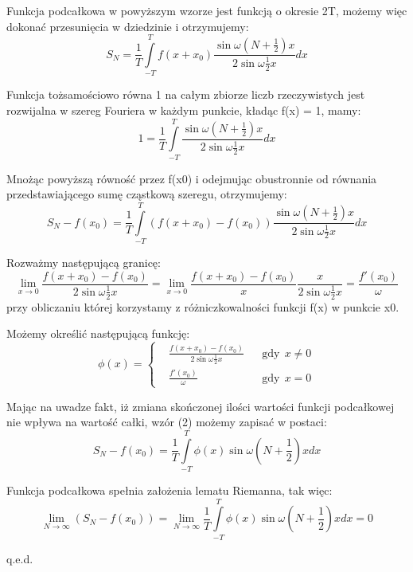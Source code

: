 \documentclass{article}
\begin{document}
Funkcja podcałkowa w powyższym wzorze jest funkcją o okresie 2T, możemy więc dokonać przesunięcia w dziedzinie i otrzymujemy: 
\begin{displaymath}
S_{N}={\frac {1}{T}}\int \limits _{-T}^{T}f(x+x_{0}){\frac {\sin \omega \left(N+{\frac {1}{2}}\right)x}{2\sin \omega {\frac {1}{2}}x}}dx
\end{displaymath}

Funkcja tożsamościowo równa 1 na całym zbiorze liczb rzeczywistych jest rozwijalna w szereg Fouriera w każdym punkcie, kładąc f(x) = 1, mamy: 
\begin{displaymath}
1={\frac {1}{T}}\int \limits _{-T}^{T}{\frac {\sin \omega \left(N+{\frac {1}{2}}\right)x}{2\sin \omega {\frac {1}{2}}x}}dx
\end{displaymath}

Mnożąc powyższą równość przez f(x0) i odejmując obustronnie od równania przedstawiającego sumę cząstkową szeregu, otrzymujemy: 
\begin{displaymath}
S_{N}-f(x_{0})={\frac {1}{T}}\int \limits _{-T}^{T}(f(x+x_{0})-f(x_{0})){\frac {\sin \omega \left(N+{\frac {1}{2}}\right)x}{2\sin \omega {\frac {1}{2}}x}}dx
\end{displaymath}

Rozważmy następującą granicę: 
\begin{displaymath}
\lim _{x\to 0}{\frac {f(x+x_{0})-f(x_{0})}{2\sin \omega {\frac {1}{2}}x}}=\lim _{x\to 0}{\frac {f(x+x_{0})-f(x_{0})}{x}}{\frac {x}{2\sin \omega {\frac {1}{2}}x}}={\frac {f'(x_{0})}{\omega }}
\end{displaymath}
przy obliczaniu której korzystamy z różniczkowalności funkcji f(x) w punkcie x0.

Możemy określić następującą funkcję: 
\begin{displaymath}
\phi (x)=\left\{{\begin{aligned}&{\frac {f(x+x_{0})-f(x_{0})}{2\sin \omega {\frac {1}{2}}x}}&&{\text{gdy}}~~x\neq 0\\&{\frac {f'(x_{0})}{\omega }}&&{\text{gdy}}~~x=0\end{aligned}}\right.
\end{displaymath}

Mając na uwadze fakt, iż zmiana skończonej ilości wartości funkcji podcałkowej nie wpływa na wartość całki, wzór (2) możemy zapisać w postaci: 
\begin{displaymath}
S_{N}-f(x_{0})={\frac {1}{T}}\int \limits _{-T}^{T}\phi (x)\sin \omega \left(N+{\frac {1}{2}}\right)xdx
\end{displaymath}

Funkcja podcałkowa spełnia założenia lematu Riemanna, tak więc: 
\begin{displaymath}
\lim _{N\to \infty }(S_{N}-f(x_{0}))=\lim _{N\to \infty }{\frac {1}{T}}\int \limits _{-T}^{T}\phi (x)\sin \omega \left(N+{\frac {1}{2}}\right)xdx=0
\end{displaymath}

q.e.d.
\end{document}
